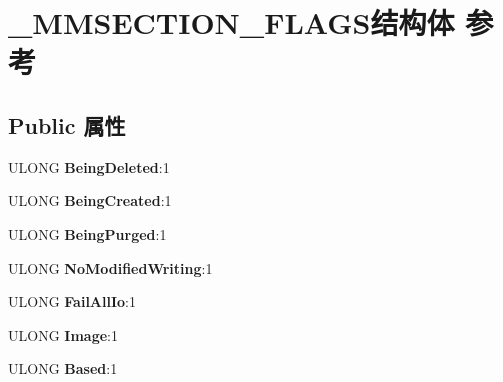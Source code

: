 \hypertarget{struct___m_m_s_e_c_t_i_o_n___f_l_a_g_s}{}\section{\+\_\+\+M\+M\+S\+E\+C\+T\+I\+O\+N\+\_\+\+F\+L\+A\+G\+S结构体 参考}
\label{struct___m_m_s_e_c_t_i_o_n___f_l_a_g_s}
\subsection*{Public 属性}
\begin{DoxyCompactItemize}
\item 
\mbox{\label{struct___m_m_s_e_c_t_i_o_n___f_l_a_g_s_a1bf78f2a727551b76a4add433ef392e7}} 
U\+L\+O\+NG {\bfseries Being\+Deleted}\+:1
\item 
\mbox{\label{struct___m_m_s_e_c_t_i_o_n___f_l_a_g_s_aab4d9fc4129b3d7f19654f280a000de2}} 
U\+L\+O\+NG {\bfseries Being\+Created}\+:1
\item 
\mbox{\label{struct___m_m_s_e_c_t_i_o_n___f_l_a_g_s_a8813793718bbb15c5e34d6ca869e9d5f}} 
U\+L\+O\+NG {\bfseries Being\+Purged}\+:1
\item 
\mbox{\label{struct___m_m_s_e_c_t_i_o_n___f_l_a_g_s_a45537669133745149fc430a9c4466152}} 
U\+L\+O\+NG {\bfseries No\+Modified\+Writing}\+:1
\item 
\mbox{\label{struct___m_m_s_e_c_t_i_o_n___f_l_a_g_s_aa574f751616f2c9d91f2a5ccd85268ce}} 
U\+L\+O\+NG {\bfseries Fail\+All\+Io}\+:1
\item 
\mbox{\label{struct___m_m_s_e_c_t_i_o_n___f_l_a_g_s_a87ff5b9290af1d1f5cbe7396fabf4b13}} 
U\+L\+O\+NG {\bfseries Image}\+:1
\item 
\mbox{\label{struct___m_m_s_e_c_t_i_o_n___f_l_a_g_s_a1d4e904856e744a3d09e53bf87218c69}} 
U\+L\+O\+NG {\bfseries Based}\+:1
\item 
\mbox{\label{struct___m_m_s_e_c_t_i_o_n___f_l_a_g_s_ab519ae2f77c7ad7eebc39233826ab7e8}} 

\end{DoxyCompactItemize}
